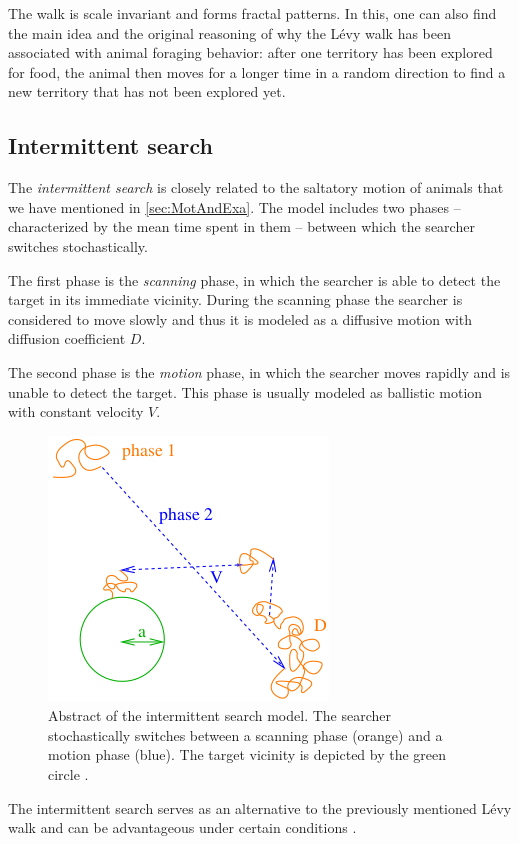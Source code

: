 The walk is scale invariant and forms fractal patterns. In this, one can also find the main idea and the original reasoning of why the Lévy walk has been associated with animal foraging behavior: after one territory has been explored for food, the animal then moves for a longer time in a random direction to find a new territory that has not been explored yet.

\subsection{Intermittent search}\label{ssec:intermittent-search}
The \textit{intermittent search} is closely related to the saltatory motion of animals that we have mentioned in \autoref{sec:MotAndExa}. The model includes two phases -- characterized by the mean time spent in them -- between which the searcher switches stochastically.

The first phase is the \textit{scanning} phase, in which the searcher is able to detect the target in its immediate vicinity. During the scanning phase the searcher is considered to move slowly and thus it is modeled as a diffusive motion with diffusion coefficient $D$.

The second phase is the \textit{motion} phase, in which the searcher moves rapidly and is unable to detect the target. This phase is usually modeled as ballistic motion with constant velocity $V$.

\begin{figure}[bth]
 \myfloatalign
 \includegraphics[width=0.4\linewidth]{gfx/intermittent-search}
 \caption[Abstract intermittent search]{Abstract of the intermittent search model. The searcher stochastically switches between a scanning phase (orange) and a motion phase (blue). The target vicinity is depicted by the green circle \cite{benichou:2011}.}\label{fig:intermittent-search}
\end{figure}

The intermittent search serves as an alternative to the previously mentioned Lévy walk and can be advantageous under certain conditions \cite{benichou:2011}.

